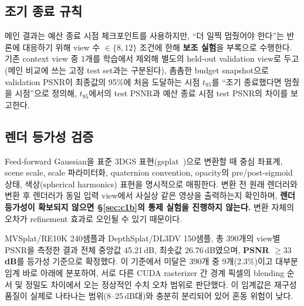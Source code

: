 \subsection{조기 종료 규칙}
\label{sec:early-stop}

메인 결과는 예산 종료 시점 체크포인트를 사용하지만, ``더 일찍 멈췄어야 한다''는 반론에 대응하기 위해 view 수 $\in \{8, 12\}$ 조건에 한해 \textbf{보조 실험}을 부록으로 수행한다. 기존 context view 중 1개를 학습에서 제외해 별도의 held-out validation view로 두고(메인 비교에 쓰는 고정 test set과는 구분된다), 촘촘한 budget snapshot으로 validation PSNR이 최종값의 95\%에 처음 도달하는 시점 $t_{95}$를 ``조기 종료했다면 멈췄을 시점''으로 정의해, $t_{95}$에서의 test PSNR과 예산 종료 시점 test PSNR의 차이를 보고한다.

\subsection{렌더 등가성 검증}
\label{sec:equivalence}

Feed-forward Gaussian을 표준 3DGS 표현(gsplat~\cite{ye2024gsplat})으로 변환할 때 중심 좌표계, scene scale, scale 파라미터화, quaternion convention, opacity의 pre/post-sigmoid 상태, 색상(spherical harmonics) 표현을 명시적으로 매핑한다. 변환 전 원래 렌더러와 변환 후 렌더러가 동일 입력 view에서 사실상 같은 영상을 출력하는지 확인하며, \textbf{렌더 등가성이 확보되지 않으면 \S\ref{sec:c1b}의 통제 실험을 진행하지 않는다.} 변환 자체의 오차가 refinement 효과로 오인될 수 있기 때문이다.

MVSplat/RE10K 240샘플과 DepthSplat/DL3DV 150샘플, 총 390개의 view별 PSNR을 측정한 결과 전체 중앙값 45.21\,dB, 최솟값 26.76\,dB였으며, \textbf{PSNR $\ge 33\,$dB}를 등가성 기준으로 확정했다. 이 기준에서 미달은 390개 중 9개(2.3\%)이고 대부분 임계 바로 아래에 분포하여, 서로 다른 CUDA rasterizer 간 경계 픽셀의 blending 순서 및 정밀도 차이에서 오는 정상적인 수치 오차 범위로 판단했다. 이 임계값은 재구성 품질이 실제로 나타나는 범위(8--25\,dB대)와 충분히 분리되어 있어 혼동 위험이 낮다.
